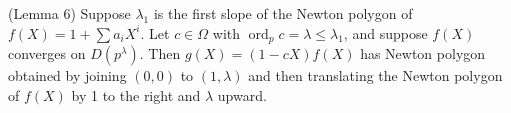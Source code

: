 (Lemma 6) Suppose $\lambda_1$ is the first slope of the Newton polygon of $f(X) = 1 + \sum a_i X^i$. Let $c \in \Omega$ with $\operatorname{ord}_p c = \lambda \leq \lambda_1$, and suppose $f(X)$ converges on $D(p^\lambda)$. Then $g(X) = (1-cX)f(X)$ has Newton polygon obtained by joining $(0,0)$ to $(1,\lambda)$ and then translating the Newton polygon of $f(X)$ by 1 to the right and $\lambda$ upward.